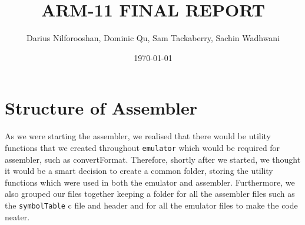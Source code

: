 \documentclass [10pt] {article}
\title{ARM-11 FINAL REPORT}
\author{Darius Nilforooshan, Dominic Qu, Sam Tackaberry, Sachin Wadhwani}
\date{\today}
\begin{document}
\maketitle

\section*{Structure of Assembler}
As we were starting the assembler, we realised that there would be utility functions that we created throughout {\tt emulator} which would be required for assembler, such as convertFormat. Therefore, shortly after we started, we thought it would be a smart decision to create a common folder, storing the utility functions which were used in both the emulator and assembler.
Furthermore, we also grouped our files together keeping a folder for all the assembler files such as the {\tt symbolTable} c file and header and for all the emulator files to make the code neater.
\end{document}
